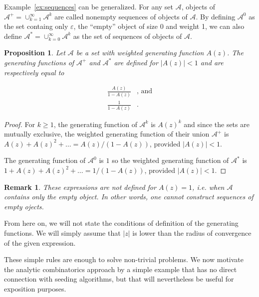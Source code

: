 \documentclass{article}
\newtheorem{proposition}{Proposition}
\newtheorem{remark}{Remark}
\begin{document}
Example~\ref{ex:sequences} can be generalized. For any set $\mathcal{A}$,
objects of $\mathcal{A}^+ = \cup_{k=1}^\infty\mathcal{A}^k$ are called
nonempty sequences of objects of $\mathcal{A}$. By defining
$\mathcal{A}^0$ as the set containg only $\varepsilon$, the ``empty''
object of size 0 and weight 1, we can also define $\mathcal{A}^* =
\cup_{k=0}^\infty\mathcal{A}^k$ as the set of sequences of objects of
$\mathcal{A}$.

\begin{proposition}
\label{th:sequences}
Let $\mathcal{A}$ be a set with weighted generating function $A(z)$. The
generating functions of $\mathcal{A}^+$ and $\mathcal{A}^*$ are defined
for $|A(z)| < 1$ and are respectively equal to

\begin{equation*}
\begin{split}
\frac{A(z)}{1-A(z)}&\text{, and} \\
\frac{1}{1-A(z)}&.
\end{split}
\end{equation*}
\end{proposition}

\begin{proof}
For $k \geq 1$, the generating function of $\mathcal{A}^k$ is $A(z)^k$ and
since the sets are mutually exclusive, the weighted generating function of
their union $\mathcal{A}^+$ is $A(z) + A(z)^2 + \ldots = A(z) / (1-A(z))$,
provided $|A(z)| < 1$.

The generating function of $\mathcal{A}^0$ is $1$ so the weighted
generating function of $\mathcal{A}^*$ is $1 + A(z) + A(z)^2 + \ldots =
1 / (1-A(z))$, provided $|A(z)| < 1$.
\end{proof}

\begin{remark}
These expressions are not defined for $A(z) = 1$, \textit{i.e.} when
$\mathcal{A}$ contains only the empty object. In other words, one cannot
construct sequences of empty ojects.
\end{remark}

From here on, we will not state the conditions of definition of the
generating functions. We will simply assume that $|z|$ is lower than the
radius of convergence of the given expression.

These simple rules are enough to solve non-trivial problems. We now
motivate the analytic combinatorics approach by a simple example that has
no direct connection with seeding algorithms, but that will nevertheless
be useful for exposition purposes.
\end{document}

